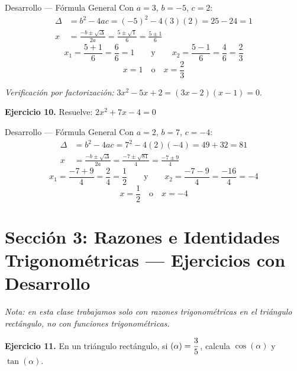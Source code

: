 \documentclass[letterpaper, 12pt]{article}
\let\sin\relax
\DeclareMathOperator{\sin}{sen}
\begin{document}
\begin{solucionbox}{Desarrollo — Fórmula General}
Con $a = 3$, $b = -5$, $c = 2$:
\begin{align*}
    \Delta &= b^2 - 4ac = (-5)^2 - 4(3)(2) = 25 - 24 = 1 \\[6pt]
    x &= \frac{-b \pm \sqrt{\Delta}}{2a} = \frac{5 \pm \sqrt{1}}{6} = \frac{5 \pm 1}{6}
\end{align*}
\[
    x_1 = \frac{5 + 1}{6} = \frac{6}{6} = 1 \qquad \text{y} \qquad x_2 = \frac{5 - 1}{6} = \frac{4}{6} = \frac{2}{3}
\]
\[\boxed{x = 1 \quad \text{o} \quad x = \frac{2}{3}}\]

\textit{Verificación por factorización:} $3x^2 - 5x + 2 = (3x - 2)(x - 1) = 0$. \checkmark
\end{solucionbox}

\vspace{0.4cm}

\textbf{Ejercicio 10.} Resuelve: $2x^2 + 7x - 4 = 0$

\begin{solucionbox}{Desarrollo — Fórmula General}
Con $a = 2$, $b = 7$, $c = -4$:
\begin{align*}
    \Delta &= b^2 - 4ac = 7^2 - 4(2)(-4) = 49 + 32 = 81 \\[6pt]
    x &= \frac{-b \pm \sqrt{\Delta}}{2a} = \frac{-7 \pm \sqrt{81}}{4} = \frac{-7 \pm 9}{4}
\end{align*}
\[
    x_1 = \frac{-7 + 9}{4} = \frac{2}{4} = \frac{1}{2} \qquad \text{y} \qquad x_2 = \frac{-7 - 9}{4} = \frac{-16}{4} = -4
\]
\[\boxed{x = \frac{1}{2} \quad \text{o} \quad x = -4}\]
\end{solucionbox}

\newpage

\section*{Sección 3: Razones e Identidades Trigonométricas — Ejercicios con Desarrollo}

\textit{Nota: en esta clase trabajamos solo con razones trigonométricas en el triángulo rectángulo, no con funciones trigonométricas.}

\vspace{0.4cm}

\textbf{Ejercicio 11.} En un triángulo rectángulo, si $\sin(\alpha) = \dfrac{3}{5}$, calcula $\cos(\alpha)$ y $\tan(\alpha)$.
\end{document}
